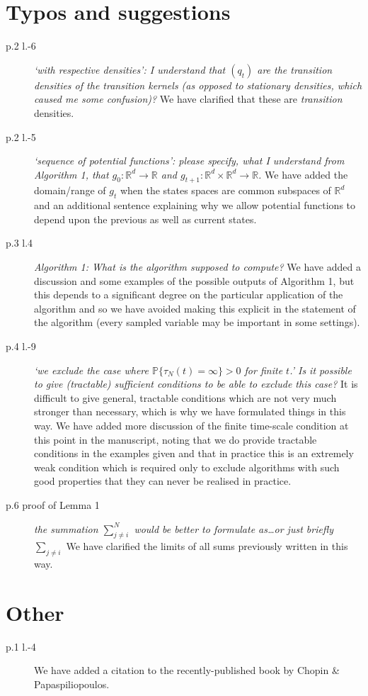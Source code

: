 \documentclass{article}
\newcommand{\rqi}[1]{{\color{blue} \it #1}}
\begin{document}
\section*{Typos and suggestions}
\begin{description}
\item[p.2 l.-6] \rqi{‘with respective densities’: I understand that $(q_t)$ are the transition densities of the transition kernels (as opposed to stationary densities, which caused me some
confusion)?} We have clarified that these are \emph{transition} densities.
\item[p.2 l.-5] \rqi{‘sequence of potential functions’: please specify, what I understand from
Algorithm 1, that $g_0 : \mathbb{R}^d \to \mathbb{R}$ and $g_{t+1} : \mathbb{R}^d \times \mathbb{R}^d \to \mathbb{R}$.} We have added the domain/range of $g_t$ when the states spaces are common subspaces of $\mathbb{R}^d$ and an additional sentence explaining why we allow potential functions to depend upon the previous as well as current states. 
\item[p.3 l.4] \rqi{Algorithm 1: What is the algorithm supposed to compute?} We have added a discussion and some examples of the possible outputs of Algorithm 1, but this depends to a significant degree on the particular application of the algorithm and so we have avoided making this explicit in the statement of the algorithm (every sampled variable may be important in some settings).
\item[p.4 l.-9] \rqi{`we exclude the case where $\mathbb{P}\{\tau_N (t) = \infty\} > 0$ for finite $t$.’ Is it possible to
give (tractable) sufficient conditions to be able to exclude this case?} It is difficult to give general, tractable conditions which are not very much stronger than necessary, which is why we have formulated things in this way. We have added more discussion of the finite time-scale condition at this point in the manuscript, noting that we do provide tractable conditions in the examples given and that in practice this is an extremely weak condition which is required only to exclude algorithms with such good properties that they can never be realised in practice.
\item[p.6 proof of Lemma 1] \rqi{the summation $\sum_{j\neq i}^N$ would be better to formulate as\dots or just briefly $\sum_{j\neq i}$} We have clarified the limits of all sums previously written in this way.
\end{description}

\section*{Other}
\begin{description}
\item[p.1 l.-4] We have added a citation to the recently-published book by Chopin \& Papaspiliopoulos.
\end{description}
\end{document}
